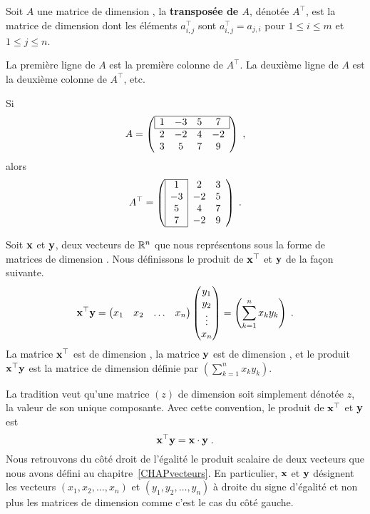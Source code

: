 {\begin{defn} 
Soit $A$ une matrice de dimension , la
{\bfseries transposée de $A$}, dénotée $A^\top$, est la matrice de
dimension  dont les éléments $a_{i,j}^\top$ sont
$a_{i,j}^\top = a_{j,i}$ pour $1 \leq i \leq m$ et $1\leq j \leq n$.
\end{defn}

La première ligne de $A$ est la première colonne de $A^\top$. La
deuxième ligne de $A$ est la deuxième colonne de $A^\top$, etc.

\begin{egg}
Si
\[
A = \left(
\begin{array}{cccc}
\hline
\multicolumn{1}{|c}{1} & -3 & 5 & \multicolumn{1}{c|}{7} \\
\hline
2 & -2 & 4 & -2 \\
3 & 5 & 7 & 9
\end{array}
\right) \; ,
\]
alors
\[
A^\top =
\left(
\begin{array}{ccc}
\cline{1-1}
\multicolumn{1}{|c|}{1} & 2 & 3 \\
\multicolumn{1}{|c|}{-3} & -2 & 5 \\
\multicolumn{1}{|c|}{5} & 4 & 7 \\
\multicolumn{1}{|c|}{7} & -2 & 9 \\
\cline{1-1}
\end{array}
\right) \; .
\]
\end{egg}

Soit $\mathbf{x}$ et $\mathbf{y}$, deux vecteurs de $\mathbb{R}^n$ que nous
représentons sous la forme de matrices de dimension .  Nous
définissons le produit de $\mathbf{x}^\top$ et $\mathbf{y}$ de la façon
suivante.
\[
\mathbf{x}^\top \mathbf{y}
= \begin{pmatrix} x_1 & x_2 & \ldots & x_n \end{pmatrix}
\begin{pmatrix} y_1 \\ y_2 \\ \vdots \\ x_n \end{pmatrix}
= \left( \sum_{k=1}^n x_k y_k \right) \; .
\]
La matrice $\mathbf{x}^\top$ est de dimension , la matrice
$\mathbf{y}$ est de dimension , et le produit
$\mathbf{x}^\top \mathbf{y}$ est la matrice de dimension  définie
par $\displaystyle \left(\sum_{k=1}^n x_k y_k\right)$.

La tradition veut qu'une matrice $\left( z \right)$ de dimension
 soit simplement dénotée $z$, la valeur de son unique
composante.  Avec cette convention, le produit de $\mathbf{x}^\top$ et
$\mathbf{y}$ est
\[
\mathbf{x}^\top \mathbf{y} = \mathbf{x} \cdot \mathbf{y} \; .
\]
Nous retrouvons du côté droit de l'égalité le produit scalaire de deux
vecteurs que nous avons défini au chapitre~\ref{CHAPvecteurs}.  En
particulier, $\mathbf{x}$ et $\mathbf{y}$ désignent les vecteurs
$(x_1,x_2,\ldots,x_n)$ et $(y_1,y_2,\ldots, y_n)$ à droite du signe
d'égalité et non plus les matrices de dimension  comme c'est
le cas du côté gauche.

}
